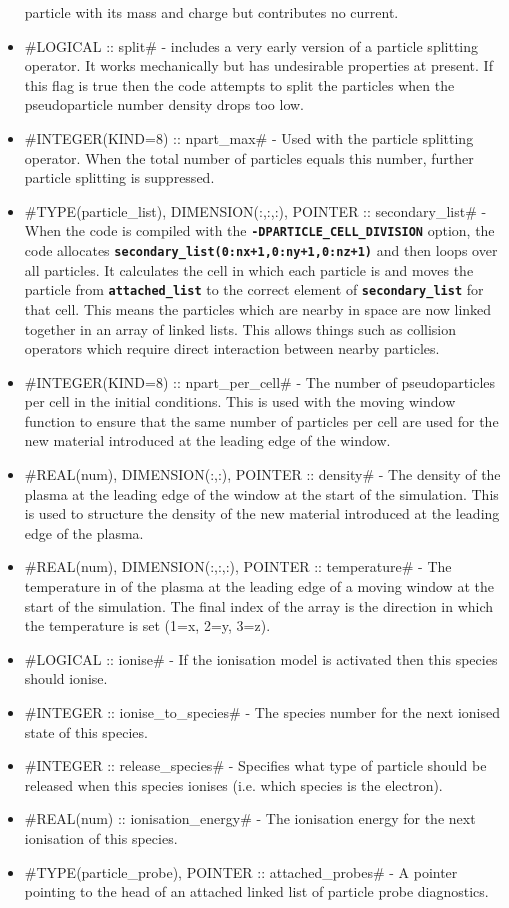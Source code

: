 \documentclass[12pt,a4paper]{article}
\newcommand{\inlinecode}[1]{{\color{warwickred} \bf\texttt{#1}}}
\newcommand{\EPOCH}{{\color{warwickdark}\fontfamily{phv}\selectfont{EPOCH}}}
\begin{document}
\begin{itemize}
  particle with its mass and charge but contributes no current.
\item #LOGICAL :: split# - {\EPOCH} includes a very early version of a particle
  splitting operator. It works mechanically but has undesirable properties at
  present. If this flag is true then the code attempts to split the particles
  when the pseudoparticle number density drops too low.
\item #INTEGER(KIND=8) :: npart_max# - Used with the particle splitting
  operator. When the total number of particles equals this number, further
  particle splitting is suppressed.
\item #TYPE(particle_list), DIMENSION(:,:,:), POINTER :: secondary_list# - When
  the code is compiled with the \inlinecode{-DPARTICLE\_CELL\_DIVISION} option,
  the code allocates\linebreak
  \inlinecode{secondary\_list(0:nx+1,0:ny+1,0:nz+1)} and then loops over all
  particles. It calculates the cell in which each particle is and moves the
  particle from \inlinecode{attached\_list} to the correct element of
  \inlinecode{secondary\_list} for that cell. This means the particles which
  are nearby in space are now linked together in an array of linked lists.
  This allows things such as collision operators which require direct
  interaction between nearby particles.
\item #INTEGER(KIND=8) :: npart_per_cell# - The number of pseudoparticles per
  cell in the initial conditions. This is used with the moving window function
  to ensure that the same number of particles per cell are used for the new
  material introduced at the leading edge of the window.
\item #REAL(num), DIMENSION(:,:), POINTER :: density# - The density of the
  plasma at the leading edge of the window at the start of the simulation. This
  is used to structure the density of the new material introduced at the leading
  edge of the plasma.
\item #REAL(num), DIMENSION(:,:,:), POINTER :: temperature# - The temperature
  in of the plasma at the leading edge of a moving window at the start of the
  simulation. The final index of the array is the direction in which the
  temperature is set (1=x, 2=y, 3=z).
\item #LOGICAL :: ionise# - If the ionisation model is activated then this
  species should ionise.
\item #INTEGER :: ionise_to_species# - The species number for the next ionised
  state of this species.
\item #INTEGER :: release_species# - Specifies what type of particle should be
  released when this species ionises (i.e. which species is the electron).
\item #REAL(num) :: ionisation_energy# - The ionisation energy for the next
  ionisation of this species.
\item #TYPE(particle_probe), POINTER :: attached_probes# - A pointer pointing to
  the head of an attached linked list of particle probe diagnostics.
\end{itemize}
\end{document}
